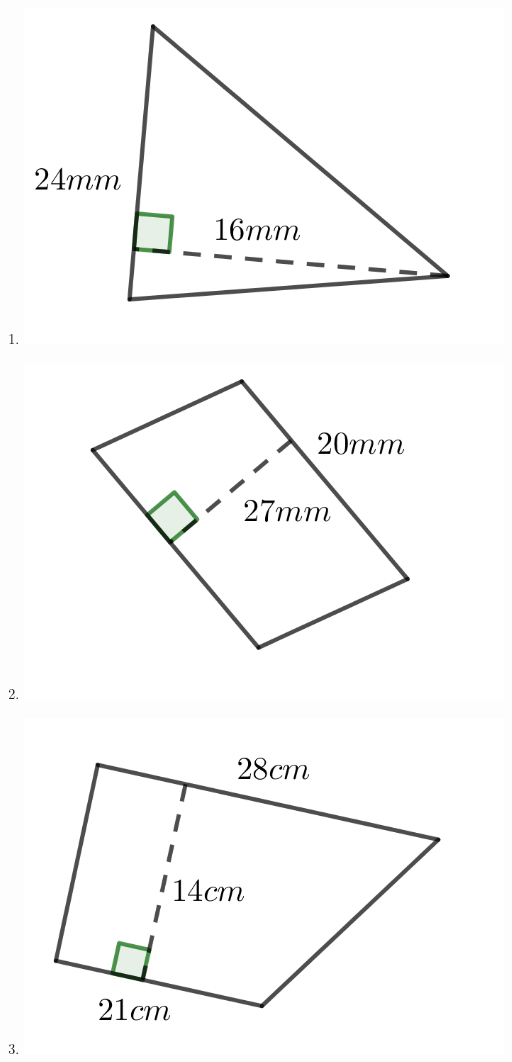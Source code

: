 \begin{multicols}{2}
\begin{enumerate}
	\item \includegraphics{./Images/Measurement/AreaQu10.png}
	\item \includegraphics{./Images/Measurement/AreaQu11.png}
	\item \includegraphics{./Images/Measurement/AreaQu12.png}

\end{enumerate}
\end{multicols}
